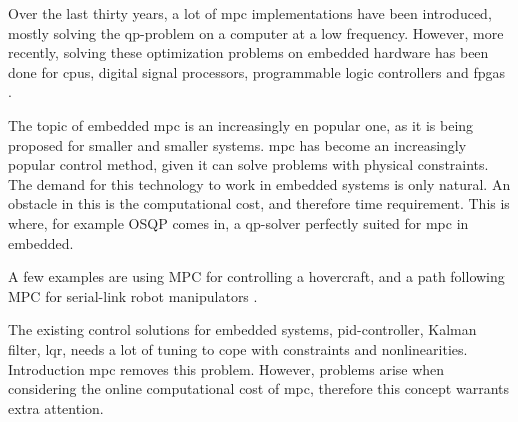Over the last thirty years, a lot of \acrshort{mpc} implementations have been introduced, mostly solving the \acrshort{qp}-problem on a computer at a low frequency. However, more recently, solving these optimization problems on embedded hardware has been done for \acrfull{cpu}s, digital signal processors, programmable logic controllers and \acrfull{fpga}s \cite{embedded_optimization_control}.

The topic of embedded \acrshort{mpc} is an increasingly en popular one, as it is being proposed for smaller and smaller systems. \acrshort{mpc} has become an increasingly popular control method, given it can solve problems with physical constraints. The demand for this technology to work in embedded systems is only natural. An obstacle in this is the computational cost, and therefore time requirement. This is where, for example OSQP comes in, a \acrshort{qp}-solver perfectly suited for \acrshort{mpc} in embedded.

A few examples are using MPC for controlling a hovercraft, and a path following MPC for serial-link robot manipulators \cite{embedded_optimization_control}. 


The existing control solutions for embedded systems, \acrshort{pid}-controller, Kalman filter, \acrshort{lqr}, needs a lot of tuning to cope with constraints and nonlinearities. Introduction \acrshort{mpc} removes this problem. However, problems arise when considering the online computational cost of \acrlong{mpc}, therefore this concept warrants extra attention. 


